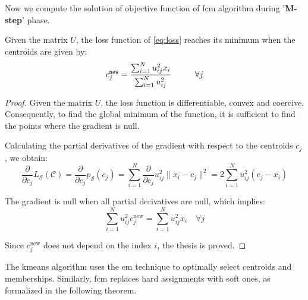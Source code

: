 \bigskip\noindent Now we compute the solution of objective function of \gls{fcm} algorithm during '\textbf{M-step}' phase.
\begin{theorem}
	\label{thm:Mupdate}
    Given the matrix $U$, the loss function of \cref{eq:loss} reaches its minimum when the centroids are given by:
    \begin{equation}
        c^{\texttt{new}}_j = \frac{\sum_{i=1}^Nu_{ij}^2x_{i}}{\sum_{i=1}^Nu_{ij}^2} \text{\hspace{1cm}} \forall j
    \end{equation}
	\begin{proof}
	    Given the matrix $U$, the loss function is differentiable, convex and coercive. Consequently, to find the global minimum of the function, it is sufficient to find the points where the gradient is null.

	    \noindent Calculating the partial derivatives of the gradient with respect to the centroids $c_j$, we obtain:
	\begin{equation*}
	    \frac{\partial}{\partial c_{j}} L_\mathcal{S}(\mathcal{C}) = \frac{\partial}{\partial c_{j}} p_\mathcal{S}(c_j) = \sum_{i=1}^N\frac{\partial}{\partial c_{j}} u_{ij}^2\|x_i-c_j\|^2 = 2\sum_{i=1}^N u_{ij}^2\left(c_{j}-x_{i}\right)
	\end{equation*}

	\noindent The gradient is null when all partial derivatives are null, which implies:
	\begin{equation*}
	    \sum_{i=1}^N u_{ij}^2c^{\text{new}}_{j} = \sum_{i=1}^N u_{ij}^2x_{i} \quad \forall j
	\end{equation*}

	\noindent Since $c^{\text{new}}_j$ does not depend on the index $i$, the thesis is proved.
	\end{proof}
\end{theorem}

\noindent The \gls{kmeans} algorithm uses the \gls{em} technique to optimally select centroids and memberships. Similarly, \gls{fcm} replaces hard assignments with soft ones, as formalized in the following theorem.\newpage

